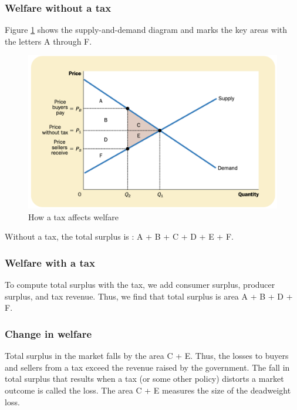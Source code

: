 \subsubsection{Welfare without a tax}

Figure \ref{fig:how-a-tax-affects-welfare} shows the supply-and-demand diagram and marks the key areas with the letters A through F.

\begin{figure}[!ht]
  \centering
  \includegraphics[width=\textwidth]{pics/how-a-tax-affects-welfare}
  \caption{How a tax affects welfare}
  \label{fig:how-a-tax-affects-welfare}
\end{figure}


Without a tax, the total surplus is : A + B + C + D + E + F.

\subsubsection{Welfare with a tax}

To compute total surplus with the tax, we add consumer surplus, producer surplus, and tax revenue.
Thus, we find that total surplus is area A + B + D + F.


\subsubsection{Change in welfare}

Total surplus in the market falls by the area C + E.
Thus, the losses to buyers and sellers from a tax exceed the revenue raised by the government.
The fall in total surplus that results when a tax (or some other policy) distorts a market outcome is called the  loss.
The area C + E measures the size of the deadweight loss.


